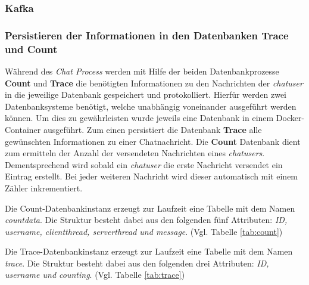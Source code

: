 \documentclass[10pt,journal,compsoc]{IEEEtran}
\begin{document}
\subsubsection{Kafka}


\subsubsection{Persistieren der Informationen in den Datenbanken Trace und Count}
Während des \textit{Chat Process} werden mit Hilfe der beiden Datenbankprozesse \textbf{Count} und \textbf{Trace} die benötigten Informationen zu den Nachrichten der \textit{chatuser} in die jeweilige Datenbank gespeichert und protokolliert. Hierfür werden zwei Datenbanksysteme benötigt, welche unabhängig voneinander ausgeführt werden können. Um dies zu gewährleisten wurde jeweils eine Datenbank in einem Docker-Container ausgeführt. Zum einen persistiert die Datenbank \textbf{Trace} alle gewünschten Informationen zu einer Chatnachricht. Die \textbf{Count} Datenbank dient zum ermitteln der Anzahl der versendeten Nachrichten eines \textit{chatusers}. Dementsprechend wird sobald ein \textit{chatuser} die erste Nachricht versendet ein Eintrag erstellt. Bei jeder weiteren Nachricht wird dieser automatisch mit einem Zähler inkrementiert. 

Die Count-Datenbankinstanz erzeugt zur Laufzeit eine Tabelle mit dem Namen \textit{countdata}. Die Struktur besteht dabei aus den folgenden fünf Attributen: \textit{ID, username, clientthread, serverthread und message}. (Vgl. Tabelle \ref{tab:count})

Die Trace-Datenbankinstanz erzeugt zur Laufzeit eine Tabelle mit dem Namen \textit{trace}. Die Struktur besteht dabei aus den folgenden drei Attributen: \textit{ID, username und counting}. (Vgl. Tabelle \ref{tab:trace})
\end{document}
